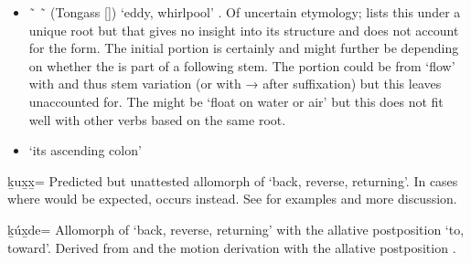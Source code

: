 \begin{morphdesc}[resume*=alphalist]
\begin{enumerate}
\begin{itemize}
				(Tongass  [])
				‘backward’
				\parencite[f01/122]{leer:1973},
				from  (T.\  []) ‘hindquarters’
				\parencite[f04/135]{leer:1973}.
			The  may be a reduced form of the allative postposition
				 \~\  ‘to, toward’.
			The  is unidentified but it could be related to either the
				instrumental postposition  (T.\  []) ‘with’
				or perhaps to the past tense  that has some other
				puzzling functions that are not obviously related to past tense.
		\item	{} \~\  \~\ 
				(Tongass  [])
				 ‘eddy, whirlpool’
				 \parencites[04/192]{leer:1973}[19]{leer:1978b}[M·91]{leer-hitch-ritter:2001}.
			Of uncertain etymology; \textcites{leer:1973}{leer:1978b} lists this under a
				unique root 
				but that gives no insight into its structure
				and does not account for the  form.
			The initial portion is certainly 
				and might further be 
				depending on whether the  is part of a following stem.
			The  portion could be from  ‘flow’
				\parencites[05/1]{leer:1973}[313]{leer:1976}
				with  and thus  stem variation
				(or  with → after suffixation)
				but this leaves  unaccounted for.
			The  might be  ‘float on water or air’
				\parencites[03/299]{leer:1973}[235]{leer:1976}
				but this does not fit well with other verbs based on the same root.
		\item	{} ‘its ascending colon’
			\parencite[M·122]{leer-hitch-ritter:2001}
		\end{itemize}
	\end{enumerate}


\item[\llap{*}ḵux̱x̱=]\label{m:ḵux̱x̱=}
	Predicted but unattested allomorph of  ‘back, reverse, returning’.
	In cases where  would be expected,  occurs instead.
	See  for examples and more discussion.

\item[ḵúx̱de=]\label{m:ḵúx̱de=}
	Allomorph of  ‘back, reverse, returning’
		with the allative postposition  ‘to, toward’.
	Derived from  and the motion derivation
		with the allative postposition .


\end{morphdesc}
